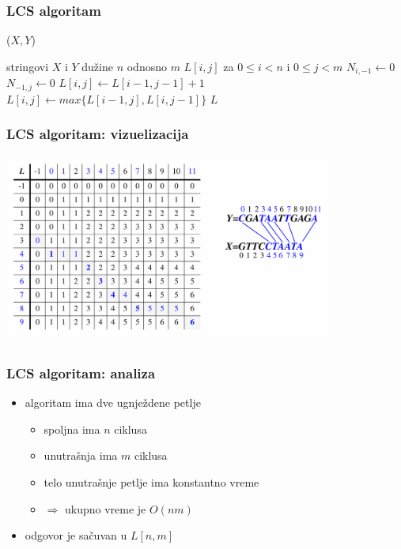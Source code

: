 \documentclass[compress]{beamer}
\begin{document}
\begin{frame}
  \frametitle{LCS algoritam}
  ($X,Y$)
  \begin{algorithmic}
    \REQUIRE stringovi $X$ i $Y$ dužine $n$ odnosno $m$
    \ENSURE $L[i,j]$ za $0\leq i<n$ i $0\leq j<m$
      \STATE $N_{i,-1} \leftarrow 0$
    \ENDFOR
      \STATE $N_{-1,j} \leftarrow 0$
    \ENDFOR
          \STATE $L[i,j] \leftarrow L[i-1,j-1]+1$
        \ELSE
          \STATE $L[i,j] \leftarrow max\{L[i-1,j], L[i,j-1]\}$
        \ENDIF
      \ENDFOR
    \ENDFOR
    \RETURN $L$
  \end{algorithmic}    
\end{frame}

\begin{frame}[fragile]
  \frametitle{LCS algoritam: vizuelizacija}
  \begin{center}
    \includegraphics[width=11cm]{asp-13-pic11.png}
  \end{center}
\end{frame}

\begin{frame}[fragile]
  \frametitle{LCS algoritam: analiza}
  \begin{itemize}
    \item algoritam ima dve ugnježdene petlje
    \begin{itemize}
      \item spoljna ima $n$ ciklusa
      \item unutrašnja ima $m$ ciklusa
      \item telo unutrašnje petlje ima konstantno vreme
      \item $\Rightarrow$ ukupno vreme je $O(nm)$
    \end{itemize}
    \item odgovor je sačuvan u $L[n,m]$
  \end{itemize}
\end{frame}
\end{document}
